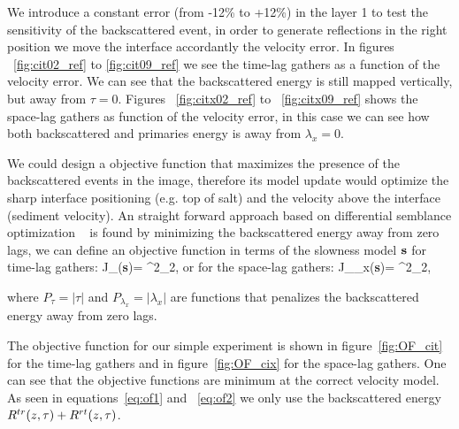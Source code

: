 We introduce a constant error (from -12\% to +12\%) in the layer 1 to test the sensitivity of the backscattered event, in order to generate
reflections in the right position we move the interface accordantly the velocity error. In figures ~\ref{fig:cit02_ref} to \ref{fig:cit09_ref}
 we see the time-lag gathers as a function of the velocity error. We can see that the backscattered energy is still mapped vertically, but
away from $\tau=0$. Figures ~\ref{fig:citx02_ref} to ~\ref{fig:citx09_ref} shows the space-lag gathers as  function of the velocity error, 
in this case we can see how both backscattered and primaries energy is away from $\lambda_x=0$. 

We could design a objective function that maximizes the presence of the backscattered events in the image, therefore its model update
would optimize the sharp interface positioning (e.g. top of salt) and the velocity above the interface (sediment velocity). An straight 
forward approach based on differential semblance optimization ~\citep{shen:2132} is found by minimizing the backscattered energy
 away from zero lags, we can define an objective function in terms of the slowness model $\bf s$ for time-lag gathers:
\beq
 J_{\tau}({\bf s})=  ^2_2,
\label{eq:of1}
\eeq 
or for the space-lag gathers:
\beq
 J_{\lambda_x}({\bf s})=  ^2_2,
\label{eq:of2}
\eeq 

where $P_{\tau}=|\tau|$ and $P_{\lambda_x}=|\lambda_x|$ are functions that penalizes the backscattered energy away 
from zero lags.

The objective function for our simple experiment is shown in figure~\ref{fig:OF_cit} for the time-lag gathers
 and in figure~\ref{fig:OF_cix} for the space-lag gathers. One can see that the objective functions are minimum at the correct velocity model.
As seen in equations~\ref{eq:of1} and ~\ref{eq:of2} we only use the backscattered energy $R^{tr}(z,\tau)+R^{rt}(z,\tau)$. 


